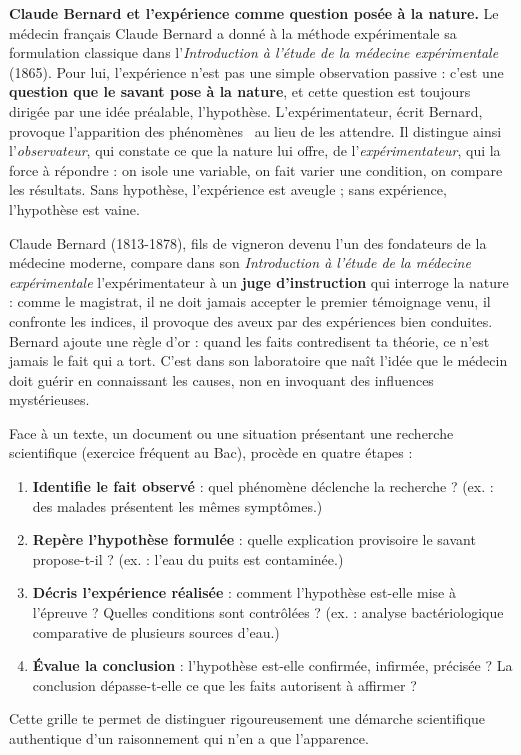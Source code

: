 \documentclass[11pt]{article}
\begin{document}
\textbf{Claude Bernard et l'expérience comme question posée à la nature.} Le médecin français Claude Bernard a donné à la méthode expérimentale sa formulation classique dans l'\emph{Introduction à l'étude de la médecine expérimentale} (1865). Pour lui, l'expérience n'est pas une simple observation passive : c'est une \textbf{question que le savant pose à la nature}, et cette question est toujours dirigée par une idée préalable, l'hypothèse. L'expérimentateur, écrit Bernard, \guillemotleft provoque l'apparition des phénomènes \guillemotright\ au lieu de les attendre. Il distingue ainsi l'\emph{observateur}, qui constate ce que la nature lui offre, de l'\emph{expérimentateur}, qui la force à répondre : on isole une variable, on fait varier une condition, on compare les résultats. Sans hypothèse, l'expérience est aveugle ; sans expérience, l'hypothèse est vaine.

\begin{savaistu}
Claude Bernard (1813-1878), fils de vigneron devenu l'un des fondateurs de la médecine moderne, compare dans son \emph{Introduction à l'étude de la médecine expérimentale} l'expérimentateur à un \textbf{juge d'instruction} qui interroge la nature : comme le magistrat, il ne doit jamais accepter le premier témoignage venu, il confronte les indices, il provoque des aveux par des expériences bien conduites. Bernard ajoute une règle d'or : quand les faits contredisent ta théorie, ce n'est jamais le fait qui a tort. C'est dans son laboratoire que naît l'idée que le médecin doit guérir en connaissant les causes, non en invoquant des influences mystérieuses.
\end{savaistu}

\begin{methode}
Face à un texte, un document ou une situation présentant une recherche scientifique (exercice fréquent au Bac), procède en quatre étapes :
\begin{enumerate}
\item \textbf{Identifie le fait observé} : quel phénomène déclenche la recherche ? (ex. : des malades présentent les mêmes symptômes.)
\item \textbf{Repère l'hypothèse formulée} : quelle explication provisoire le savant propose-t-il ? (ex. : l'eau du puits est contaminée.)
\item \textbf{Décris l'expérience réalisée} : comment l'hypothèse est-elle mise à l'épreuve ? Quelles conditions sont contrôlées ? (ex. : analyse bactériologique comparative de plusieurs sources d'eau.)
\item \textbf{Évalue la conclusion} : l'hypothèse est-elle confirmée, infirmée, précisée ? La conclusion dépasse-t-elle ce que les faits autorisent à affirmer ?
\end{enumerate}
Cette grille te permet de distinguer rigoureusement une démarche scientifique authentique d'un raisonnement qui n'en a que l'apparence.
\end{methode}
\end{document}
